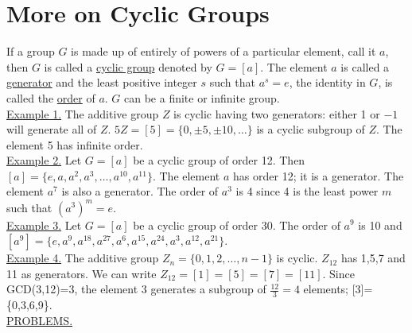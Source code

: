 \documentclass[12pt]{book}
\theoremstyle{definition}
\begin{document}
\section{More on Cyclic Groups}
\quad If a group $G$ is made up of entirely of powers of a particular element, call it $a$, then $G$ is called a \underline{cyclic group} denoted by $G=[a]$.  The element $a$ is called a \underline{generator} and the least positive integer $s$ such that $a^s=e$, the identity in $G$, is called the \underline{order} of $a$.  $G$ can be a finite or infinite group.\\[.1in]
\underline{Example 1.} The additive group $Z$ is cyclic having two generators: either 1 or $-1$ will generate all of $Z$.  $5Z=[5]=\{0,\pm5,\pm10,\dots\}$ is a cyclic subgroup of $Z$.  The element 5 has infinite order.\\[.1in]
\underline{Example 2.}  Let $G=[a]$ be a cyclic group of order 12.  Then $[a]=\{e,a,a^2,a^3,\dots,a^{10},a^{11}\}$.  The element $a$ has order 12; it is a generator.   The element $a^7$ is also a generator.  The order of $a^3$ is 4 since 4 is the least power $m$ such that $(a^3)^m=e$.\\[.1in]
\underline{Example 3.}  Let $G=[a]$ be a cyclic group of order 30.  The order of $a^9$ is 10 and\\
$[a^9]=\{e,a^9,a^{18},a^{27},a^{6},a^{15},a^{24},a^{3},a^{12},a^{21}\}$.\\[.1in]
\underline{Example 4.} The additive group $Z_n=\{0,1,2,\dots,n-1\}$ is cyclic.  $Z_{12}$ has 1,5,7 and 11 as generators.  We can write $Z_{12} = [1]=[5]=[7]=[11]$.  Since GCD(3,12)=3, the element 3 generates a subgroup of $\frac{12}{3}=4$ elements; [3]=\{0,3,6,9\}.\\[.5in]
\underline{PROBLEMS.}
\end{document}
